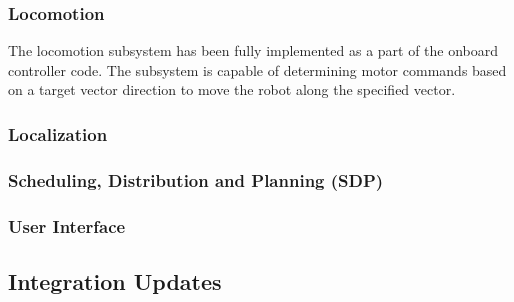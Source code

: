 \subsubsection{Locomotion}
The locomotion subsystem has been fully implemented as a part of the onboard controller code. The subsystem is capable of determining motor commands based on a target vector direction to move the robot along the specified vector.

\subsubsection{Localization}


\subsubsection{Scheduling, Distribution and Planning (SDP)}

\subsubsection{User Interface}


\subsection{Integration Updates}
\label{sec:integration_progress}

\clearpage
